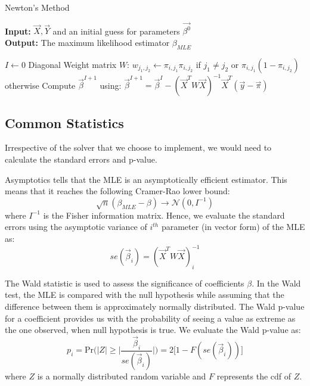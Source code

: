 \begin{algorithm}
\caption{Newton's Method}
	\textbf{Input:} $\vec{X},\vec{Y}$ and an initial guess for parameters $\vec{\beta^{0}}$ \\
	\textbf{Output:} The maximum likelihood estimator $\beta_{MLE}$
\begin{algorithmic}               
\State $I \leftarrow 0$
\Repeat 
\State Diagonal Weight matrix $W$: $w_{j_1,j_2} \leftarrow \pi_{i,j_1}\pi_{i,j_2}$ if $j_1 \neq j_2$ or $\pi_{i,j_1}(1-\pi_{i,j_2})$ otherwise
\State Compute $\vec{\beta}^{I+1}$  using:
\State $\vec{\beta}^{I+1} =\vec{\beta}^{I} - (\vec{X}^{T} W \vec{X})^{-1} \vec{X}^{T} (\vec{y} - \vec{\pi}) $
\end{algorithmic}
\label{alg:Newton}
\end{algorithm}



\subsection{Common Statistics}\label{sec:stats}
Irrespective of the solver that we choose to implement, we would need to calculate the standard errors and p-value. 

Asymptotics tells that the MLE is an asymptotically efficient estimator. This means that  it reaches the following Cramer-Rao lower bound:
\begin{equation}
\sqrt{n}(\beta_{MLE} - \beta) \rightarrow \mathcal{N}(0,I^{-1})
\end{equation} 
where $I^{-1}$ is the Fisher information matrix. Hence, we evaluate the standard errors using  the asymptotic variance of $i^{th}$ parameter (in vector form) of the MLE as:
\begin{equation}
se(\vec{\beta}_i) = (\vec{X}^{T} W \vec{X})^{-1}_{i}
\end{equation}

The Wald statistic is used to assess the significance of coefficients $\beta$. In the Wald test, the MLE is compared with the null hypothesis while assuming that the difference between them is approximately normally distributed. The Wald p-value for a coefficient provides us with the probability of seeing a value as extreme as the one observed, when null hypothesis is true. We evaluate the Wald p-value as:
\begin{equation}
p_i = \mbox{Pr}\Big(|Z| \geq \big|\frac{\vec{\beta}_i}{se(\vec{\beta}_i)} \big| \Big) = 2 \Big[1 - F(se(\vec{\beta}_i)) \Big]
\end{equation}
where $Z$ is a normally distributed random variable and $F$ represents the cdf of $Z$.


